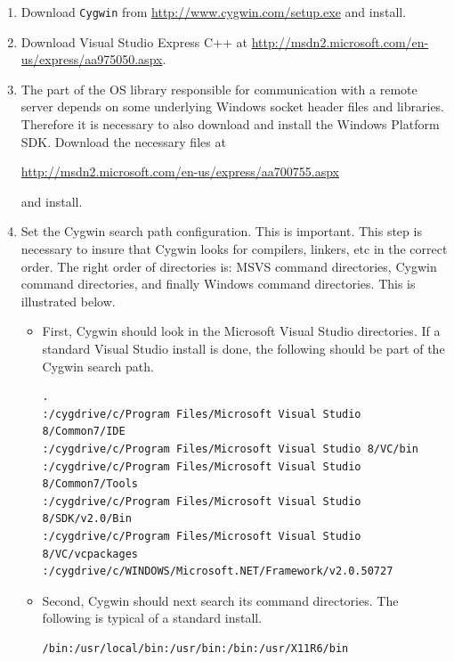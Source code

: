 \documentclass[11pt]{article}
\renewcommand{\_}{{\char"5F}}
\renewcommand{\{}{{\char"7B}}
\renewcommand{\}}{{\char"7D}}
\renewcommand{\^}{{\char"0D}}
\renewcommand{\'}{{\char"0D}}
\begin{document}
\begin{enumerate}[Step 1:]
\item{}  Download {\tt Cygwin}  from \url{http://www.cygwin.com/setup.exe} and install.




\item{}  Download  Visual Studio Express C++ at  \url{http://msdn2.microsoft.com/en-us/express/aa975050.aspx}.


\item{}  The part of the OS library responsible for communication with a remote server depends on some 
underlying Windows socket header files and libraries. Therefore it is necessary to also download and install 
the Windows Platform SDK. Download the necessary files at

 \url{http://msdn2.microsoft.com/en-us/express/aa700755.aspx}

 and install.



\item{}  Set the Cygwin search path configuration. This is important.
This step is necessary to insure that Cygwin   looks for compilers, linkers, etc in the correct order.  The right order of directories  is: MSVS command directories, Cygwin command directories, and finally Windows command directories.  This is illustrated below.

\begin{itemize}

 \item First, Cygwin should look in the Microsoft Visual Studio directories.  
If a standard Visual Studio install is done, the following  should be part of the 
Cygwin search path.

\begin{verbatim}
.
:/cygdrive/c/Program Files/Microsoft Visual Studio 8/Common7/IDE
:/cygdrive/c/Program Files/Microsoft Visual Studio 8/VC/bin
:/cygdrive/c/Program Files/Microsoft Visual Studio 8/Common7/Tools
:/cygdrive/c/Program Files/Microsoft Visual Studio 8/SDK/v2.0/Bin
:/cygdrive/c/Program Files/Microsoft Visual Studio 8/VC/vcpackages
:/cygdrive/c/WINDOWS/Microsoft.NET/Framework/v2.0.50727
\end{verbatim}

\item Second, Cygwin should next search its  command directories.  The following is typical of a standard install.

\begin{verbatim}
/bin:/usr/local/bin:/usr/bin:/bin:/usr/X11R6/bin
\end{verbatim}


\end{itemize}
\end{enumerate}
\end{document}
